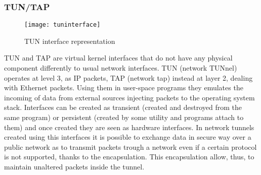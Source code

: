 \subsubsection*{TUN/TAP}
\begin{figure}
  \centering \texttt{[image: tuninterface]}
  \caption{TUN interface representation}
  \label{chap:prjan:img:tun}
\end{figure}
TUN and TAP are virtual kernel interfaces that do not have any physical
component differently to usual network interfaces. TUN (network TUNnel) operates
at level 3, as IP packets, TAP (network tap) instead at layer 2, dealing with
Ethernet packets. Using them in user-space programs they emulates the incoming
of data from external sources injecting packets to the operating system stack.
Interfaces can be created as transient (created and destroyed from the same
program) or persistent (created by some utility and programs attach to them) and
once created they are seen as hardware interfaces. In network tunnels created
using this interfaces it is possible to exchange data in secure way over a
public network as to transmit packets trough a network even if a certain protocol
is not supported, thanks to the encapsulation. This encapsulation allow, thus,
to maintain unaltered packets inside the tunnel.


